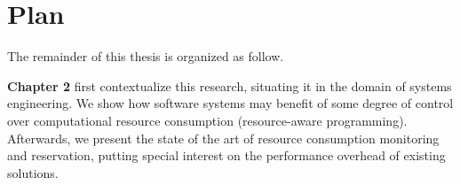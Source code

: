 %
%
%
%
%
%
%


\section{Plan}

The remainder of this thesis is organized as follow.

\textbf{Chapter 2} first contextualize this research, situating it in the domain of systems engineering.
We show how software systems may benefit of some degree of control over computational resource consumption (resource-aware programming).
Afterwards, we present the state of the art of resource consumption monitoring and reservation, putting special interest on the performance overhead of existing solutions.

